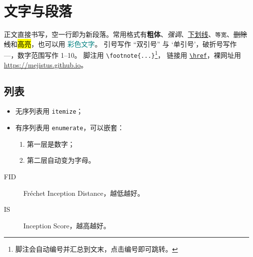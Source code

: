 \newcommand{\E}{\mathbb{E}}
\newcommand{\R}{\mathbb{R}}
\newtheorem{hyp}{假设}

\begin{abstract}
这篇文章本身就是一份模板：每一节演示一类日常写作场景。对照同目录下的 \texttt{example.tex} 即可看到对应的 LaTeX 源码，复制需要的片段即可使用。
页面由 HaTeX 在浏览器中渲染：公式交给 KaTeX，代码交给 Prism，TikZ 图优先加载预渲染的 SVG，没有时由 TikZJax 现场编译。
\end{abstract}

\section{文字与段落}\label{sec:text}
正文直接书写，空一行即为新段落。常用格式有\textbf{粗体}、\emph{强调}、\underline{下划线}、\texttt{等宽}、\sout{删除线}和\hl{高亮}，也可以用 \textcolor{teal}{彩色文字}。
引号写作 ``双引号'' 与 `单引号'，破折号写作 ---，数字范围写作 1--10。
脚注用 \verb|\footnote{...}|\footnote{脚注会自动编号并汇总到文末，点击编号即可跳转。}，
链接用 \href{https://github.com/mejistus}{\texttt{\textbackslash href}}，裸网址用 \url{https://mejistus.github.io}。

\subsection{列表}
\begin{itemize}
  \item 无序列表用 \texttt{itemize}；
  \item 有序列表用 \texttt{enumerate}，可以嵌套：
  \begin{enumerate}
    \item 第一层是数字；
    \item 第二层自动变为字母。
  \end{enumerate}
\end{itemize}
\begin{description}
  \item[FID] Fréchet Inception Distance，越低越好。
  \item[IS] Inception Score，越高越好。
\end{description}

